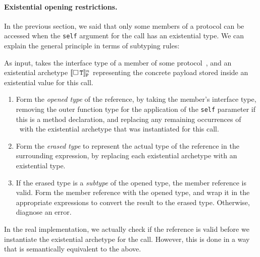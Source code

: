 \documentclass[../generics]{subfiles}
\begin{document}
\paragraph{Existential opening restrictions.}
In the previous section, we said that only some members of a protocol can be accessed when the \texttt{self} argument for the call has an existential type. We can explain the general principle in terms of subtyping rules:
\begin{algorithm}\label{alg:check existential member}
As input, takes the interface type of a member of some protocol~\tP, and an existential archetype $[\![\Box\,\texttt{T}]\!]^n_\texttt{P}$ representing the concrete payload stored inside an existential value for this call.
\begin{enumerate}
\item Form the \emph{opened type} of the reference, by taking the member's interface type, removing the outer function type for the application of the \texttt{self} parameter if this is a method declaration, and replacing any remaining occurrences of \tSelf\ with the existential archetype that was instantiated for this call.

\item Form the \emph{erased type} to represent the actual type of the reference in the surrounding expression, by replacing each existential archetype with an existential type.

\item If the erased type is a \emph{subtype} of the opened type, the member reference is valid. Form the member reference with the opened type, and wrap it in the appropriate expressions to convert the result to the erased type. Otherwise, diagnose an error.
\end{enumerate}
\end{algorithm}
In the real implementation, we actually check if the reference is valid before we instantiate the existential archetype for the call. However, this is done in a way that is semantically equivalent to the above.
\end{document}
